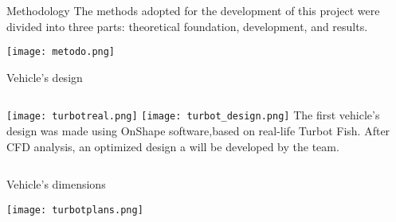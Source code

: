 \begin{frame}[c]{Methodology}
  The methods adopted for the development of this project were divided into three parts: theoretical foundation, development, and results. \linebreak
  \transboxin[duration=1,direction=30]

  \centering
  \texttt{[image: metodo.png]}
\end{frame}
\begin{frame}[t]{Vehicle's design}
  \transboxout[duration=0.5]
  \begin{columns}
      \texttt{[image: turbotreal.png]}
      \linebreak
      \linebreak
      \texttt{[image: turbot\_design.png]}
      The first vehicle's design was made using OnShape software,based on real-life Turbot Fish.  
      \linebreak
      \linebreak
      After CFD analysis, an optimized design a will be developed by the team.
  \end{columns}
\end{frame}
\begin{frame}[t]{Vehicle's dimensions}
  \centering
  \begin{center}
    \texttt{[image: turbotplans.png]}
  \end{center}
\end{frame}

